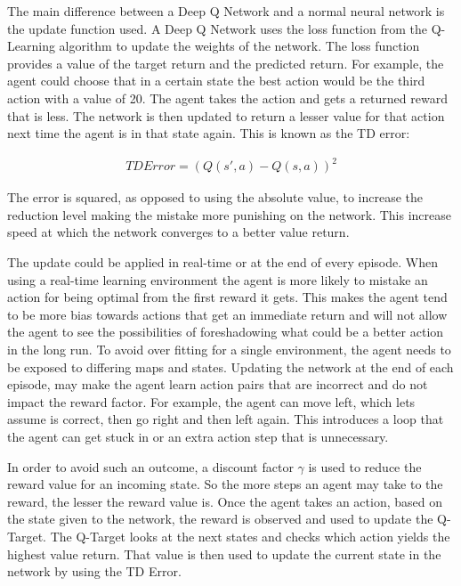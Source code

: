 The main difference between a Deep Q Network and a normal neural network is the
update function used. A Deep Q Network uses the loss function from the
Q-Learning algorithm to update the weights of the network. The loss function
provides a value of the target return and the predicted return. For example,
the agent could choose that in a certain state the best action would be the
third action with a value of 20. The agent takes the action and gets a returned
reward that is less. The network is then updated to return a lesser value for
that action next time the agent is in that state again. This is known as the TD
error:

\begin{align}
    TD Error = {(Q(s',a) - Q(s,a))}^{2}
\end{align}

The error is squared, as opposed to using the absolute value, to increase the
reduction level making the mistake more punishing on the network. This increase
speed at which the network converges to a better value return.

The update could be applied in real-time or at the end of every episode. When
using a real-time learning environment the agent is more likely to mistake an
action for being optimal from the first reward it gets. This makes the agent
tend to be more bias towards actions that get an immediate return and will not
allow the agent to see the possibilities of foreshadowing what could be a
better action in the long run. To avoid over fitting for a single environment,
the agent needs to be exposed to differing maps and states. Updating the
network at the end of each episode, may make the agent learn action pairs that
are incorrect and do not impact the reward factor. For example, the agent can
move left, which lets assume is correct, then go right and then left again.
This introduces a loop that the agent can get stuck in or an extra action step
that is unnecessary.

In order to avoid such an outcome, a discount factor $\gamma$ is used to reduce
the reward value for an incoming state. So the more steps an agent may take to
the reward, the lesser the reward value is. Once the agent takes an action,
based on the state given to the network, the reward is observed and used to
update the Q-Target. The Q-Target looks at the next states and checks which
action yields the highest value return. That value is then used to update the
current state in the network by using the TD Error.

